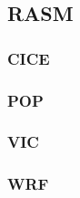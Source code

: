 \subsection{RASM}

\subsubsection{CICE}

\subsubsection{POP}

\subsubsection{VIC}

\subsubsection{WRF}

  